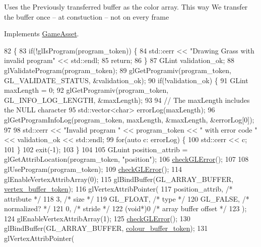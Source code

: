 Uses the Previously transferred buffer as the color array. This way We transfer the buffer once -- at constuction -- not on every frame

Implements \hyperlink{classGameAsset_a961aa51ca0a9961fc584c0b5d5431300}{Game\+Asset}.


\begin{DoxyCode}
82                                           \{
83   \textcolor{keywordflow}{if}(!glIsProgram(program\_token)) \{
84     std::cerr << \textcolor{stringliteral}{"Drawing Grass with invalid program"} << std::endl;
85     \textcolor{keywordflow}{return};
86   \}
87   GLint validation\_ok;
88   glValidateProgram(program\_token);
89   glGetProgramiv(program\_token, GL\_VALIDATE\_STATUS, &validation\_ok);
90   \textcolor{keywordflow}{if}(!validation\_ok) \{
91     GLint maxLength = 0;
92     glGetProgramiv(program\_token, GL\_INFO\_LOG\_LENGTH, &maxLength);
93 
94     \textcolor{comment}{// The maxLength includes the NULL character}
95     std::vector<char> errorLog(maxLength);
96     glGetProgramInfoLog(program\_token, maxLength, &maxLength, &errorLog[0]);
97 
98     std::cerr << \textcolor{stringliteral}{"Invalid program "} << program\_token << \textcolor{stringliteral}{" with error code "} << validation\_ok << std::endl;
99     \textcolor{keywordflow}{for}(\textcolor{keyword}{auto} c: errorLog) \{
100       std::cerr << c;
101     \}
102     exit(-1);
103   \}
104 
105   GLuint position\_attrib = glGetAttribLocation(program\_token, \textcolor{stringliteral}{"position"});
106   \hyperlink{GrassAsset_8cc_a75f201b0e53e68726854997957322b8d}{checkGLError}();
107 
108   glUseProgram(program\_token);
109   \hyperlink{GrassAsset_8cc_a75f201b0e53e68726854997957322b8d}{checkGLError}();
114   glEnableVertexAttribArray(0);
115   glBindBuffer(GL\_ARRAY\_BUFFER, \hyperlink{classGrassAsset_a7b98229bcd980cddf4435518c254322e}{vertex\_buffer\_token});
116   glVertexAttribPointer(
117     position\_attrib,        \textcolor{comment}{/* attribute */}
118     3,        \textcolor{comment}{/* size */}
119     GL\_FLOAT,   \textcolor{comment}{/* type */}
120     GL\_FALSE,   \textcolor{comment}{/* normalized? */}
121     0,        \textcolor{comment}{/* stride */}
122     (\textcolor{keywordtype}{void}*)0    \textcolor{comment}{/* array buffer offset */}
123   );
124   glEnableVertexAttribArray(1);
125   \hyperlink{GrassAsset_8cc_a75f201b0e53e68726854997957322b8d}{checkGLError}();
130   glBindBuffer(GL\_ARRAY\_BUFFER, \hyperlink{classGrassAsset_a96a3d9c956d29cd63308c7a97f6ac3bf}{colour\_buffer\_token});
131   glVertexAttribPointer(

\end{DoxyCode}

